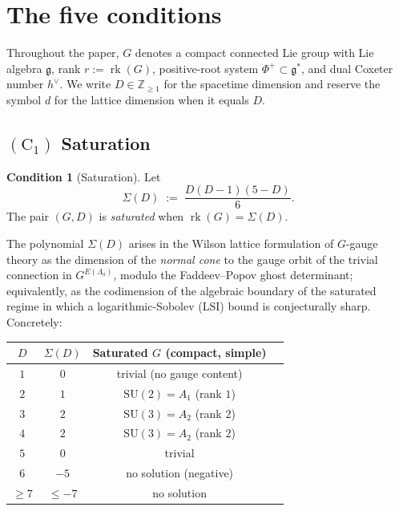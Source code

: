 \documentclass[11pt,reqno]{amsart}
\theoremstyle{plain}
\theoremstyle{definition}
\newtheorem{condition}[theorem]{Condition}
\theoremstyle{remark}
\newcommand{\bbZ}{\mathbb{Z}}
\newcommand{\Lat}{\Lambda}
\newcommand{\rk}{\operatorname{rk}}
\newcommand{\SU}{\mathrm{SU}}
\newcommand{\Cone}{(\mathrm{C}_1)}
\begin{document}
\section{The five conditions}
\label{sec:five-conditions}

Throughout the paper, $G$ denotes a compact connected Lie group with Lie algebra $\mathfrak{g}$, rank $r := \rk(G)$, positive-root system $\Phi^+ \subset \mathfrak{g}^*$, and dual Coxeter number $h^\vee$. We write $D \in \bbZ_{\ge 1}$ for the spacetime dimension and reserve the symbol $d$ for the lattice dimension when it equals $D$.

\subsection{$\Cone$ Saturation}\label{ssec:C1}

\begin{condition}[Saturation]\label{cond:C1}
Let
\[
  \Sigma(D) \;:=\; \frac{D(D-1)(5-D)}{6}.
\]
The pair $(G, D)$ is \emph{saturated} when $\rk(G) = \Sigma(D)$.
\end{condition}

The polynomial $\Sigma(D)$ arises in the Wilson lattice formulation of $G$-gauge theory as the dimension of the \emph{normal cone} to the gauge orbit of the trivial connection in $G^{E(\Lat_a)}$, modulo the Faddeev--Popov ghost determinant; equivalently, as the codimension of the algebraic boundary of the saturated regime in which a logarithmic-Sobolev (LSI) bound is conjecturally sharp. Concretely:

\begin{center}
\begin{tabular}{cccp{8cm}}
\toprule
$D$ & $\Sigma(D)$ & Saturated $G$ (compact, simple) \\
\midrule
$1$ & $0$ & trivial (no gauge content) \\
$2$ & $1$ & $\SU(2) = A_1$ (rank $1$) \\
$3$ & $2$ & $\SU(3) = A_2$ (rank $2$) \\
$4$ & $2$ & $\SU(3) = A_2$ (rank $2$) \\
$5$ & $0$ & trivial \\
$6$ & $-5$ & no solution (negative) \\
$\ge 7$ & $\le -7$ & no solution \\
\bottomrule
\end{tabular}
\end{center}
\end{document}
